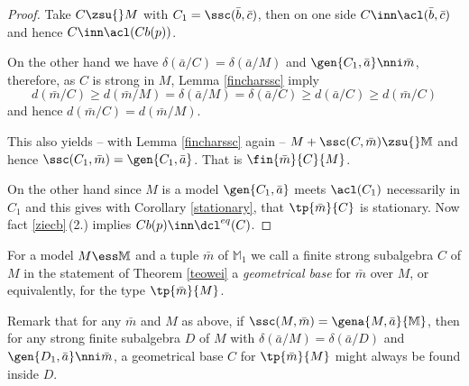 \begin{proof}
Take $C\zsu{}M$ with $C_{1}=\ssc(\bar b,\bar c)$,
then on one side $C\inn\acl(\bar b,\bar c)$ and hence $C\inn\acl(Cb(p))$.

On the other hand we have $\delta(\bar a/C)=\delta(\bar a/M)$ and $\gen{C_{1},\bar a}\nni\bar m$, therefore, as
$C$ is strong in $M$, Lemma \ref{fincharssc} imply
$$
d(\bar m/C)\geq d(\bar m/M)=\delta(\bar a/M)=\delta(\bar a/C)\geq d(\bar a/C)\geq d(\bar m/C)
$$
and hence $d(\bar m/C)=d(\bar m/M)$.

This also yields -- with Lemma \ref{fincharssc} again --  $M+\ssc(C,\bar m)\zsu{}\mathbb{M}$ and hence $\ssc(C_{1},\bar m)=\gen{C_{1},\bar a}$. That is $\fin{\bar m}{C}{M}$.

On the other hand since $M$ is a model $\gen{C_{1},\bar a}$ meets
$\acl(C_{1})$ necessarily in $C_{1}$ and this gives with Corollary \ref{stationary}, that $\tp{\bar m}{C}$
is stationary. Now fact \ref{ziecb}\,(2.) implies $Cb(p)\inn\dcl^{eq}(C)$.
\end{proof}

\begin{dfn}\label{gbase}
For a model $M\ess\mathbb{M}$ and a tuple $\bar m$ of $\mathbb{M}_{1}$ we call a finite strong subalgebra $C$ of $M$ in the 
statement of Theorem \ref{teowei} a {\em geometrical base} for $\bar m$ over $M$, or equivalently,
for the type $\tp{\bar m}{M}$.
\end{dfn}
Remark that for any $\bar m$ and $M$ as above,
if $\ssc(M,\bar m)=\gena{M,\bar a}{\mathbb{M}}$, then for any strong finite subalgebra $D$ of $M$ with
$\delta(\bar a/M)=\delta(\bar a/D)$ and $\gen{D_{1},\bar a}\nni\bar m$,
a geometrical base $C$ for $\tp{\bar m}{M}$ might always be found inside $D$.

